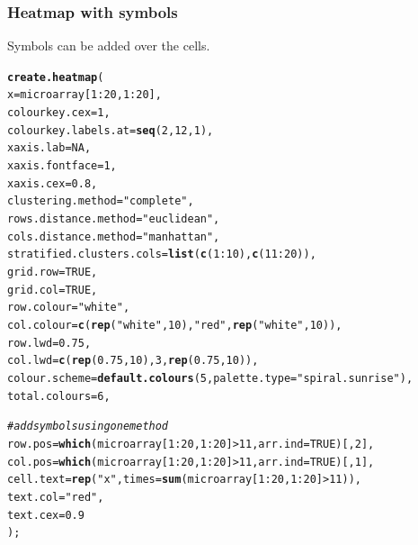 \documentclass[letterpaper]{article}\usepackage[]{graphicx}\usepackage[]{color}
\makeatletter
\newcommand{\hlnum}[1]{\textcolor[rgb]{0.686,0.059,0.569}{#1}}%
\newcommand{\hlstr}[1]{\textcolor[rgb]{0.192,0.494,0.8}{#1}}%
\newcommand{\hlcom}[1]{\textcolor[rgb]{0.678,0.584,0.686}{\textit{#1}}}%
\newcommand{\hlopt}[1]{\textcolor[rgb]{0,0,0}{#1}}%
\newcommand{\hlstd}[1]{\textcolor[rgb]{0.345,0.345,0.345}{#1}}%
\newcommand{\hlkwc}[1]{\textcolor[rgb]{0.333,0.667,0.333}{#1}}%
\newcommand{\hlkwd}[1]{\textcolor[rgb]{0.737,0.353,0.396}{\textbf{#1}}}%
\newenvironment{kframe}{%
 \def\at@end@of@kframe{}%
 \ifinner\ifhmode%
  \def\at@end@of@kframe{\end{minipage}}%
  \begin{minipage}{\columnwidth}%
 \fi\fi%
 \def\FrameCommand##1{\hskip\@totalleftmargin \hskip-\fboxsep
 \colorbox{shadecolor}{##1}\hskip-\fboxsep
     \hskip-\linewidth \hskip-\@totalleftmargin \hskip\columnwidth}%
 \MakeFramed {\advance\hsize-\width
   \@totalleftmargin\z@ \linewidth\hsize
   \@setminipage}}%
 {\par\unskip\endMakeFramed%
 \at@end@of@kframe}
\newenvironment{knitrout}{}{} %
\makeatother
\begin{document}
\subsubsection{Heatmap with symbols}
Symbols can be added over the cells.

\begin{knitrout}
\color{fgcolor}\begin{kframe}
\begin{alltt}
\hlkwd{create.heatmap}\hlstd{(}
    \hlkwc{x} \hlstd{= microarray[}\hlnum{1}\hlopt{:}\hlnum{20}\hlstd{,} \hlnum{1}\hlopt{:}\hlnum{20}\hlstd{],}
    \hlkwc{colourkey.cex} \hlstd{=} \hlnum{1}\hlstd{,}
    \hlkwc{colourkey.labels.at} \hlstd{=} \hlkwd{seq}\hlstd{(}\hlnum{2}\hlstd{,} \hlnum{12}\hlstd{,} \hlnum{1}\hlstd{),}
    \hlkwc{xaxis.lab} \hlstd{=} \hlnum{NA}\hlstd{,}
    \hlkwc{xaxis.fontface} \hlstd{=} \hlnum{1}\hlstd{,}
    \hlkwc{xaxis.cex} \hlstd{=} \hlnum{0.8}\hlstd{,}
    \hlkwc{clustering.method} \hlstd{=} \hlstr{"complete"}\hlstd{,}
    \hlkwc{rows.distance.method} \hlstd{=} \hlstr{"euclidean"}\hlstd{,}
    \hlkwc{cols.distance.method} \hlstd{=} \hlstr{"manhattan"}\hlstd{,}
    \hlkwc{stratified.clusters.cols} \hlstd{=} \hlkwd{list}\hlstd{(}\hlkwd{c}\hlstd{(}\hlnum{1}\hlopt{:}\hlnum{10}\hlstd{),} \hlkwd{c}\hlstd{(}\hlnum{11}\hlopt{:}\hlnum{20}\hlstd{)),}
    \hlkwc{grid.row} \hlstd{=} \hlnum{TRUE}\hlstd{,}
    \hlkwc{grid.col} \hlstd{=} \hlnum{TRUE}\hlstd{,}
    \hlkwc{row.colour} \hlstd{=} \hlstr{"white"}\hlstd{,}
    \hlkwc{col.colour} \hlstd{=} \hlkwd{c}\hlstd{(}\hlkwd{rep}\hlstd{(}\hlstr{"white"}\hlstd{,} \hlnum{10}\hlstd{),} \hlstr{"red"}\hlstd{,} \hlkwd{rep}\hlstd{(}\hlstr{"white"}\hlstd{,}\hlnum{10}\hlstd{)),}
    \hlkwc{row.lwd} \hlstd{=} \hlnum{0.75}\hlstd{,}
    \hlkwc{col.lwd} \hlstd{=} \hlkwd{c}\hlstd{(}\hlkwd{rep}\hlstd{(}\hlnum{0.75}\hlstd{,} \hlnum{10}\hlstd{),} \hlnum{3}\hlstd{,} \hlkwd{rep}\hlstd{(}\hlnum{0.75}\hlstd{,}\hlnum{10}\hlstd{)),}
   \hlkwc{colour.scheme} \hlstd{=} \hlkwd{default.colours}\hlstd{(}\hlnum{5}\hlstd{,} \hlkwc{palette.type} \hlstd{=} \hlstr{"spiral.sunrise"}\hlstd{),}
   \hlkwc{total.colours} \hlstd{=} \hlnum{6}\hlstd{,}

   \hlcom{# add symbols using one method}
   \hlkwc{row.pos} \hlstd{=} \hlkwd{which}\hlstd{(microarray[}\hlnum{1}\hlopt{:}\hlnum{20}\hlstd{,} \hlnum{1}\hlopt{:}\hlnum{20}\hlstd{]} \hlopt{>} \hlnum{11}\hlstd{,} \hlkwc{arr.ind} \hlstd{=} \hlnum{TRUE}\hlstd{)[,}\hlnum{2}\hlstd{],}
   \hlkwc{col.pos} \hlstd{=} \hlkwd{which}\hlstd{(microarray[}\hlnum{1}\hlopt{:}\hlnum{20}\hlstd{,} \hlnum{1}\hlopt{:}\hlnum{20}\hlstd{]} \hlopt{>} \hlnum{11}\hlstd{,} \hlkwc{arr.ind} \hlstd{=} \hlnum{TRUE}\hlstd{)[,}\hlnum{1}\hlstd{],}
   \hlkwc{cell.text} \hlstd{=} \hlkwd{rep}\hlstd{(}\hlstr{"x"}\hlstd{,} \hlkwc{times} \hlstd{=} \hlkwd{sum}\hlstd{(microarray[}\hlnum{1}\hlopt{:}\hlnum{20}\hlstd{,} \hlnum{1}\hlopt{:}\hlnum{20}\hlstd{]} \hlopt{>} \hlnum{11}\hlstd{)),}
   \hlkwc{text.col} \hlstd{=} \hlstr{"red"}\hlstd{,}
   \hlkwc{text.cex} \hlstd{=} \hlnum{0.9}
   \hlstd{);}
\end{alltt}
\end{kframe}\begin{figure}


\end{figure}
\end{knitrout}
\end{document}
